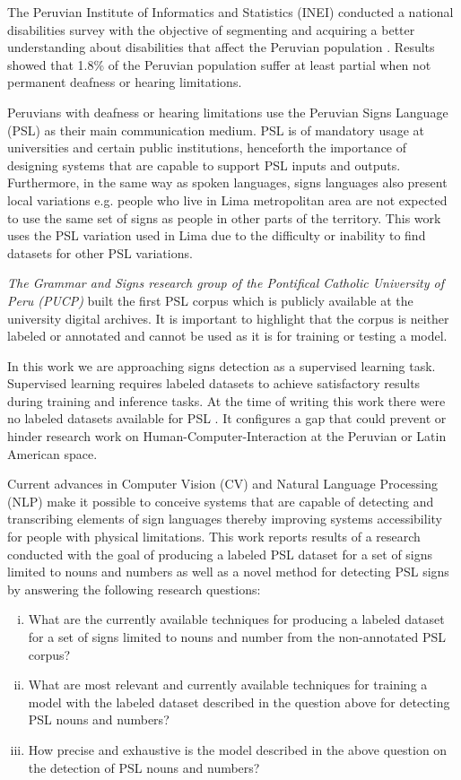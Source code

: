 \documentclass[twocolumn,conference]{article}
\begin{document}
The Peruvian Institute of Informatics and Statistics (INEI) conducted a national disabilities survey with the objective of segmenting and acquiring a better understanding about disabilities that affect the Peruvian population \cite{disabilities_survey_2012}. Results showed that 1.8\% of the Peruvian population suffer at least partial when not permanent deafness or hearing limitations. 

Peruvians with deafness or hearing limitations use the Peruvian Signs Language (PSL) as their main communication medium. PSL is of mandatory usage at universities and certain public institutions, henceforth the importance of designing systems that are capable to support PSL inputs and outputs. Furthermore, in the same way as spoken languages, signs languages also present local variations e.g. people who live in Lima metropolitan area are not expected to use the same set of signs as people in other parts of the territory. This work uses the PSL variation used in Lima due to the difficulty or inability to find datasets for other PSL variations. 

\textit{The Grammar and Signs research group of the Pontifical Catholic University of Peru (PUCP)} built the first PSL corpus \cite{lsp_dataset} which is publicly available at the university digital archives. It is important to highlight that the corpus is neither labeled or annotated and cannot be used as it is for training or testing a model.

In this work we are approaching signs detection as a supervised learning task. Supervised learning requires labeled datasets to achieve satisfactory results during training and inference tasks. At the time of writing this work there were no labeled datasets available for PSL \cite{lsp_2015}. It configures a gap that could prevent or hinder research work on Human-Computer-Interaction at the Peruvian or Latin American space.

Current advances in Computer Vision (CV) and Natural Language Processing (NLP) make it possible to conceive systems that are capable of detecting and transcribing elements of sign languages thereby improving systems accessibility for people with physical limitations. This work reports results of a research conducted with the goal of producing a labeled PSL dataset for a set of signs limited to nouns and numbers as well as a novel method for detecting PSL signs by answering the following research questions:

\begin{enumerate}[(i)]
\item What are the currently available techniques for producing a labeled dataset for a set of signs limited to nouns and number from the non-annotated PSL corpus?\label{q1}
\item What are most relevant and currently available techniques for training a model with the labeled dataset described in the question above for detecting PSL nouns and numbers?\label{q2}
\item How precise and exhaustive is the model described in the above question on the detection of PSL nouns and numbers?\label{q3}
\end{enumerate}
\end{document}
